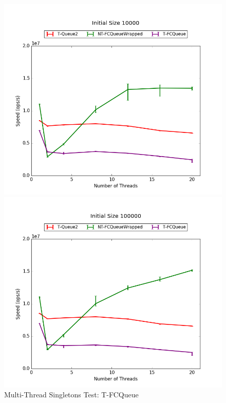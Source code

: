 \begin{figure}[H]
    \centering
	\begin{minipage}{0.5\textwidth}\includegraphics[width=\textwidth]{fcqueues/tQ:RandSingleOps10000.png}
    \end{minipage}
	\begin{minipage}{0.45\textwidth}
    
    \end{minipage}
	\begin{minipage}{0.5\textwidth}\includegraphics[width=\textwidth]{fcqueues/tQ:RandSingleOps100000.png}
    \end{minipage}
	\begin{minipage}{0.45\textwidth}
    
    \end{minipage}
\caption{Multi-Thread Singletons Test: T-FCQueue}
\label{fig:tqueues}
\end{figure}

